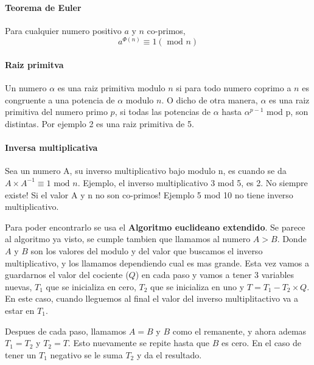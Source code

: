 \documentclass[12pt, oneside]{article}
\begin{document}
\paragraph{Teorema de Euler}
Para cualquier numero positivo $a$ y $n$ co-primos,
\begin{equation}
    a^{\Phi(n)}\equiv 1 (\text{ mod }n)
    \label{eq:eulerTeo}
\end{equation}


\paragraph{Raiz primitva}
Un numero $\alpha$ es una raiz primitiva modulo $n$ si para todo numero coprimo a $n$
es congruente a una potencia de $\alpha$ modulo $n$.
O dicho de otra manera, $\alpha$ es una raiz primitiva del numero primo $p$, si
todas las potencias de $\alpha$ hasta $\alpha^{p-1}$ mod p, son distintas.
Por ejemplo 2 es una raiz primitiva de 5.




\paragraph{Inversa multiplicativa}
Sea un numero A, su inverso multiplicativo bajo modulo n, es cuando se da
$A\times A^{-1} \equiv 1 \text{ mod }n$.
Ejemplo, el inverso multiplicativo 3 mod 5, es 2.
No siempre existe! Si el valor A y n no son co-primos!
Ejemplo 5 mod 10 no tiene inverso multiplicativo.

Para poder encontrarlo se usa el \textbf{Algoritmo euclideano extendido}.
Se parece al algoritmo ya visto, se cumple tambien que llamamos al numero $A>B$.
Donde $A$ y $B$ son los valores del modulo y del valor que buscamos el inverso multiplicativo,
y los llamamos dependiendo cual es mas grande.
Esta vez vamos a guardarnos el valor del cociente ($Q$) en cada paso y vamos a
tener 3 variables nuevas, $T_1$ que se inicializa en cero, $T_2$ que se inicializa en
uno y $T=T_1-T_2\times Q$.
En este caso, cuando lleguemos al final el valor del inverso multiplitactivo
va a estar en $T_1$.

Despues de cada paso, llamamos $A=B$ y $B$ como el remanente, y ahora ademas
$T_1=T_2$ y $T_2=T$.
Esto nuevamente se repite hasta que $B$ es cero.
En el caso de tener un $T_1$ negativo se le suma $T_2$ y da el resultado.
\end{document}
